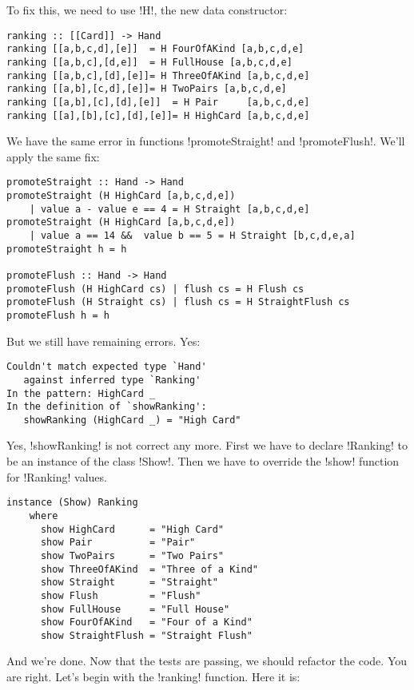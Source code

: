 \lhA \error To fix this, we need to use \il!H!, the new data constructor:
\begin{lstlisting}[frame=single]
ranking :: [[Card]] -> Hand
ranking [[a,b,c,d],[e]]  = H FourOfAKind [a,b,c,d,e]
ranking [[a,b,c],[d,e]]  = H FullHouse [a,b,c,d,e]
ranking [[a,b,c],[d],[e]]= H ThreeOfAKind [a,b,c,d,e]
ranking [[a,b],[c,d],[e]]= H TwoPairs [a,b,c,d,e]
ranking [[a,b],[c],[d],[e]]  = H Pair     [a,b,c,d,e]
ranking [[a],[b],[c],[d],[e]]= H HighCard [a,b,c,d,e] 
\end{lstlisting} \newpage
\lhN We have the same error in functions \il!promoteStraight! and \il!promoteFlush!.
\lhA \error We'll apply the same fix:
\begin{lstlisting}[frame=single]
promoteStraight :: Hand -> Hand
promoteStraight (H HighCard [a,b,c,d,e]) 
    | value a - value e == 4 = H Straight [a,b,c,d,e]
promoteStraight (H HighCard [a,b,c,d,e]) 
    | value a == 14 &&  value b == 5 = H Straight [b,c,d,e,a]
promoteStraight h = h

promoteFlush :: Hand -> Hand
promoteFlush (H HighCard cs) | flush cs = H Flush cs
promoteFlush (H Straight cs) | flush cs = H StraightFlush cs
promoteFlush h = h
\end{lstlisting}
\error But we still have remaining errors.
\lhN Yes: \\
\begin{small}
\begin{verbatim}
Couldn't match expected type `Hand' 
   against inferred type `Ranking'
In the pattern: HighCard _
In the definition of `showRanking': 
   showRanking (HighCard _) = "High Card"
\end{verbatim}
\end{small}
\lhA Yes, \il!showRanking! is not correct any more. First we have to declare \il!Ranking! to be an instance of the class \il!Show!. Then we have to override the \il!show! function for \il!Ranking! values.
\begin{lstlisting}[frame=single]
instance (Show) Ranking
    where
      show HighCard      = "High Card"
      show Pair          = "Pair" 
      show TwoPairs      = "Two Pairs" 
      show ThreeOfAKind  = "Three of a Kind" 
      show Straight      = "Straight" 
      show Flush         = "Flush" 
      show FullHouse     = "Full House" 
      show FourOfAKind   = "Four of a Kind"
      show StraightFlush = "Straight Flush"
\end{lstlisting}
\success And we're done.
\lhN Now that the tests are passing, we should refactor the code.
\lhA You are right. Let's begin with the \il!ranking! function. Here it is:
